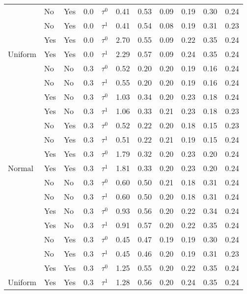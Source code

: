 \begin{tabular}[t]{lllrlrrrrrr}
 & No & Yes & 0.0 & $\tau^0$ & 0.41 & 0.53 & 0.09 & 0.19 & 0.30 & 0.24\\

 & No & Yes & 0.0 & $\tau^1$ & 0.41 & 0.54 & 0.08 & 0.19 & 0.31 & 0.23\\

 & Yes & Yes & 0.0 & $\tau^0$ & 2.70 & 0.55 & 0.09 & 0.22 & 0.35 & 0.24\\

\multirow{-8}{*}{\raggedright\arraybackslash Uniform} & Yes & Yes & 0.0 & $\tau^1$ & 2.29 & 0.57 & 0.09 & 0.24 & 0.35 & 0.24\\
\cmidrule{1-11}
 & No & No & 0.3 & $\tau^0$ & 0.52 & 0.20 & 0.20 & 0.19 & 0.16 & 0.24\\

 & No & No & 0.3 & $\tau^1$ & 0.55 & 0.20 & 0.20 & 0.19 & 0.16 & 0.24\\

 & Yes & No & 0.3 & $\tau^0$ & 1.03 & 0.34 & 0.20 & 0.23 & 0.18 & 0.24\\

 & Yes & No & 0.3 & $\tau^1$ & 1.06 & 0.33 & 0.21 & 0.23 & 0.18 & 0.23\\

 & No & Yes & 0.3 & $\tau^0$ & 0.52 & 0.22 & 0.20 & 0.18 & 0.15 & 0.23\\

 & No & Yes & 0.3 & $\tau^1$ & 0.51 & 0.22 & 0.21 & 0.19 & 0.15 & 0.24\\

 & Yes & Yes & 0.3 & $\tau^0$ & 1.79 & 0.32 & 0.20 & 0.23 & 0.20 & 0.24\\

\multirow{-8}{*}{\raggedright\arraybackslash Normal} & Yes & Yes & 0.3 & $\tau^1$ & 1.81 & 0.33 & 0.20 & 0.23 & 0.20 & 0.24\\
\cmidrule{1-11}
 & No & No & 0.3 & $\tau^0$ & 0.60 & 0.50 & 0.21 & 0.18 & 0.31 & 0.24\\

 & No & No & 0.3 & $\tau^1$ & 0.60 & 0.50 & 0.20 & 0.18 & 0.31 & 0.24\\

 & Yes & No & 0.3 & $\tau^0$ & 0.93 & 0.56 & 0.20 & 0.22 & 0.34 & 0.24\\

 & Yes & No & 0.3 & $\tau^1$ & 0.91 & 0.57 & 0.20 & 0.22 & 0.35 & 0.24\\

 & No & Yes & 0.3 & $\tau^0$ & 0.45 & 0.47 & 0.19 & 0.19 & 0.30 & 0.24\\

 & No & Yes & 0.3 & $\tau^1$ & 0.45 & 0.46 & 0.20 & 0.19 & 0.31 & 0.23\\

 & Yes & Yes & 0.3 & $\tau^0$ & 1.25 & 0.55 & 0.20 & 0.22 & 0.35 & 0.24\\

\multirow{-8}{*}{\raggedright\arraybackslash Uniform} & Yes & Yes & 0.3 & $\tau^1$ & 1.28 & 0.56 & 0.20 & 0.24 & 0.35 & 0.24\\
\bottomrule
\end{tabular}
